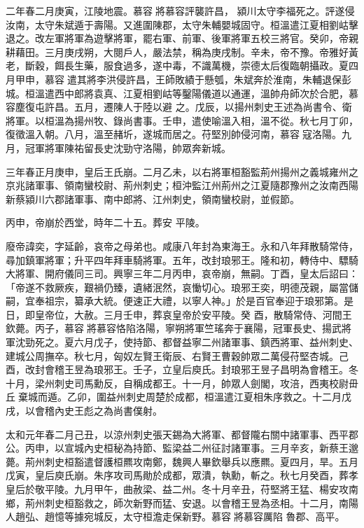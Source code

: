 \begin{pinyinscope}
 二年春二月庚寅，江陵地震。慕容將慕容評襲許昌，
 潁川太守李福死之。評遂侵汝南，太守朱斌遁于壽陽。又進圍陳郡，太守朱輔嬰城固守。桓溫遣江夏相劉岵擊退之。改左軍將軍為遊擊將軍，罷右軍、前軍、後軍將軍五校三將官。癸卯，帝親耕藉田。三月庚戌朔，大閱戶人，嚴法禁，稱為庚戌制。辛未，帝不豫。帝雅好黃老，斷穀，餌長生藥，服食過多，遂中毒，不識萬機，崇德太后復臨朝攝政。夏四月甲申，慕容遣其將李洪侵許昌，王師敗績于懸瓠，朱斌奔於淮南，朱輔退保彭城。桓溫遣西中郎將袁真、江夏相劉岵等鑿陽儀道以通運，溫帥舟師次於合肥，慕容塵復屯許昌。五月，遷陳人于陸以避
 之。戊辰，以揚州刺史王述為尚書令、衛將軍。以桓溫為揚州牧、錄尚書事。壬申，遣使喻溫入相，溫不從。秋七月丁卯，復徵溫入朝。八月，溫至赭圻，遂城而居之。苻堅別帥侵河南，慕容寇洛陽。九月，冠軍將軍陳祐留長史沈勁守洛陽，帥眾奔新城。



 三年春正月庚申，皇后王氏崩。二月乙未，以右將軍桓豁監荊州揚州之義城雍州之京兆諸軍事、領南蠻校尉、荊州刺史；桓沖監江州荊州之江夏隨郡豫州之汝南西陽新蔡潁川六郡諸軍事、南中郎將、江州刺史，領南蠻校尉，並假節。



 丙申，帝崩於西堂，時年二十五。葬安
 平陵。



 廢帝諱奕，字延齡，哀帝之母弟也。咸康八年封為東海王。永和八年拜散騎常侍，尋加鎮軍將軍；升平四年拜車騎將軍。五年，改封琅邪王。隆和初，轉侍中、驃騎大將軍、開府儀同三司。興寧三年二月丙申，哀帝崩，無嗣。丁酉，皇太后詔曰：「帝遂不救厥疾，艱禍仍臻，遺緒泯然，哀慟切心。琅邪王奕，明德茂親，屬當儲嗣，宜奉祖宗，纂承大統。便速正大禮，以寧人神。」於是百官奉迎于琅邪第。是日，即皇帝位，大赦。三月壬申，葬哀皇帝於安平陵。癸
 酉，散騎常侍、河間王欽薨。丙子，慕容將慕容恪陷洛陽，寧朔將軍竺瑤奔于襄陽，冠軍長史、揚武將軍沈勁死之。夏六月戊子，使持節、都督益寧二州諸軍事、鎮西將軍、益州刺史、建城公周撫卒。秋七月，匈奴左賢王衛辰、右賢王曹穀帥眾二萬侵苻堅杏城。己酉，改封會稽王昱為琅邪王。壬子，立皇后庾氏。封琅邪王昱子昌明為會稽王。冬十月，梁州刺史司馬勳反，自稱成都王。十一月，帥眾人劍閣，攻涪，西夷校尉毌丘棄城而遁。乙卯，圍益州刺史周楚於成都，桓溫遣江夏相朱序救之。十二月戊戌，以會稽內史王彪之為尚書僕射。



 太和元年春二月己丑，以涼州刺史張天錫為大將軍、都督隴右關中諸軍事、西平郡公。丙申，以宣城內史桓秘為持節、監梁益二州征討諸軍事。三月辛亥，新蔡王邈薨。荊州刺史桓豁遣督護桓羆攻南鄭，魏興人畢欽舉兵以應羆。夏四月，旱。五月戊寅，皇后庾氏崩。朱序攻司馬勛於成都，眾潰，執勳，斬之。秋七月癸酉，葬孝皇后於敬平陵。九月甲午，曲赦梁、益二州。冬十月辛丑，苻堅將王猛、楊安攻南鄉，荊州刺史桓豁救之，師次新野而猛、安退。以會稽王昱為丞相。十二月，南陽人趙弘、趙憶等據宛城反，太守桓澹走保新野。慕容將慕容厲陷
 魯郡、高平。




\end{pinyinscope}
